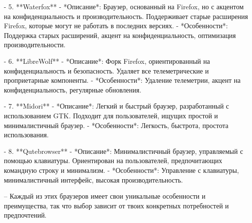 -  5. **Waterfox**
   - *Описание*: Браузер, основанный на Firefox, но с акцентом на конфиденциальность и производительность. Поддерживает старые расширения Firefox, которые могут не работать в последних версиях.
   - *Особенности*: Поддержка старых расширений, акцент на конфиденциальность, оптимизация производительности.

-  6. **LibreWolf**
   - *Описание*: Форк Firefox, ориентированный на конфиденциальность и безопасность. Удаляет все телеметрические и проприетарные компоненты.
   - *Особенности*: Удаление телеметрии, акцент на конфиденциальность, регулярные обновления.

-  7. **Midori**
   - *Описание*: Легкий и быстрый браузер, разработанный с использованием GTK. Подходит для пользователей, ищущих простой и минималистичный браузер.
   - *Особенности*: Легкость, быстрота, простота использования.

-  8. **Qutebrowser**
   - *Описание*: Минималистичный браузер, управляемый с помощью клавиатуры. Ориентирован на пользователей, предпочитающих командную строку и минимализм.
   - *Особенности*: Управление с клавиатуры, минималистичный интерфейс, высокая производительность.

-- Каждый из этих браузеров имеет свои уникальные особенности и преимущества, так что выбор зависит от твоих конкретных потребностей и предпочтений.